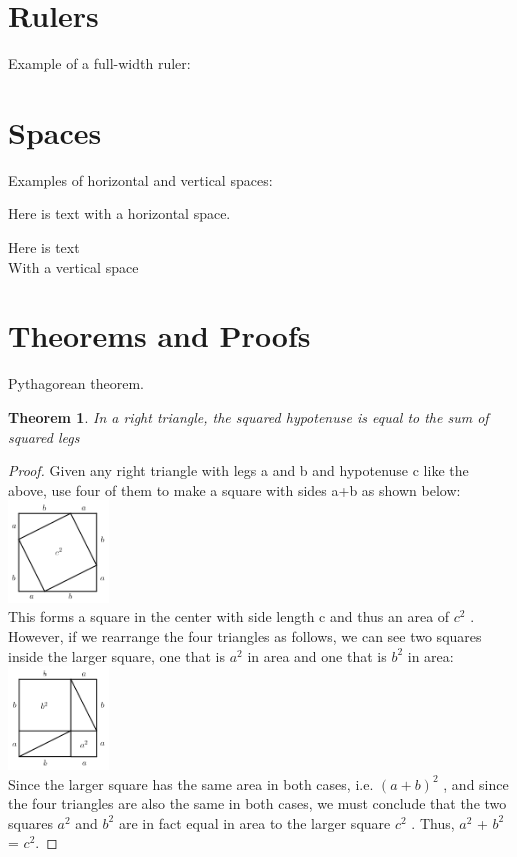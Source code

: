 \documentclass{article}
\begin{document}
\section{Rulers}
Example of a full-width ruler:

\begin{center}
\hrulefill
\end{center}

\section{Spaces}
Examples of horizontal and vertical spaces:

Here is text \hspace{2cm} with a horizontal space.

Here is text \vspace{2cm}\\
With a vertical space

\section{Theorems and Proofs}
Pythagorean theorem.

\newtheorem{theorem}{Theorem}
\begin{theorem}
In a right triangle, the squared hypotenuse is equal to the sum of squared legs 
\end{theorem}

\begin{proof}
Given any right triangle with legs a and b and hypotenuse c like the above, use four of them to make a square with sides a+b as shown below:\\
\includegraphics[width=0.2\textwidth]{pic-1.png}\\

This forms a square in the center with side length c and thus an area of \(c^2\) . However, if we rearrange the four triangles as follows, we can see two squares inside the larger square, one that is \(a^2\) in area and one that is \(b^2\) in area:\\
\includegraphics[width=0.2\textwidth]{pic-2.png}\\
Since the larger square has the same area in both cases, i.e. \((a+b)^2\) , and since the four triangles are also the same in both cases, we must conclude that the two squares \(a^2\) and \(b^2\) are in fact equal in area to the larger square \(c^2\) . Thus, \(a^2\) + \(b^2\) = \(c^2\).
\end{proof}
\end{document}
